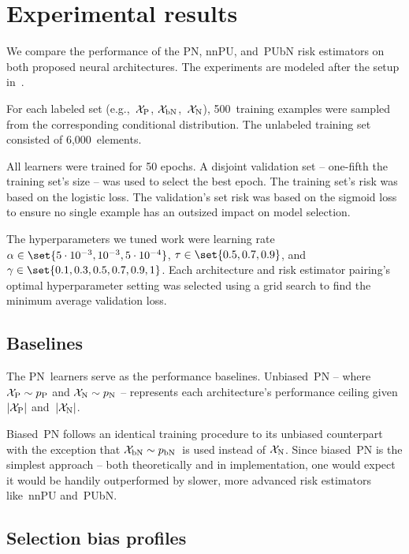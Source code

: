 \section{Experimental results}\label{sec:ExperimentalResults}

We compare the performance of the PN, nnPU, and~PUbN risk estimators on both proposed neural architectures.  The experiments are modeled after the setup in~\cite{Hsieh:2018}.

For each labeled set (e.g.,~$\mathcal{X}_{\textnormal{P}}$, $\mathcal{X}_{\textnormal{bN}}$,~$\mathcal{X}_{\textnormal{N}}$), 500~training examples were sampled from the corresponding conditional distribution.  The unlabeled training set consisted of 6,000~elements.

All learners were trained for 50 epochs. A disjoint validation set -- one-fifth the training set's size -- was used to select the best epoch. The training set's risk was based on the logistic loss.  The validation's set risk was based on the sigmoid loss to ensure no single example has an outsized impact on model selection.

The hyperparameters we tuned work were learning rate ${\alpha \in \set{5 \cdot 10^{-3}, 10^{-3}, 5 \cdot 10^{-4}}}$, ${\tau \in \set{0.5, 0.7, 0.9}}$, and ${\gamma \in \set{0.1, 0.3, 0.5, 0.7, 0.9, 1}}$.  Each architecture and risk estimator pairing's optimal hyperparameter setting was selected using a grid search to find the minimum average validation loss.

\subsection{Baselines}

The PN~learners serve as the performance baselines.  Unbiased~PN -- where ${\mathcal{X}_{\textnormal{P}} \sim p_{\textnormal{P}}}$ and ${\mathcal{X}_{\textnormal{N}} \sim p_{\textnormal{N}}}$ -- represents each architecture's performance ceiling given~$\lvert\mathcal{X}_{\textnormal{P}}\rvert$ and~$\lvert\mathcal{X}_{\textnormal{N}}\rvert$.

Biased~PN follows an identical training procedure to its unbiased counterpart with the exception that ${\mathcal{X}_{\textnormal{bN}} \sim p_{\textnormal{bN}}}$~is used instead of $\mathcal{X}_{\textnormal{N}}$.  Since biased~PN is the simplest approach -- both theoretically and in implementation, one would expect it would be handily outperformed by slower, more advanced risk estimators like~nnPU and~PUbN.

\subsection{Selection bias profiles}

